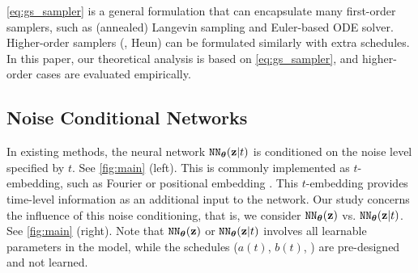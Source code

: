 \cref{eq:gs_sampler} is a general formulation that can encapsulate many first-order samplers, such as (annealed) Langevin sampling and Euler-based ODE solver. Higher-order samplers (\eg, Heun) can be formulated similarly with extra schedules. In this paper, our theoretical analysis is based on \cref{eq:gs_sampler}, and higher-order cases are evaluated empirically.

















\subsection{Noise Conditional Networks}\label{subsec:time_conditioning}

In existing methods, the neural network ${\texttt{NN}}_{{\bm{\theta}}}({\mathbf{z}}|t)$ is conditioned on the noise level specified by $t$. See \cref{fig:main} (left).
This is commonly implemented as $t$-embedding, such as Fourier \cite{tancik2020fourier} or positional embedding \cite{vaswani2017attention}. This $t$-embedding provides time-level information as an additional input to the network. Our study concerns the influence of this noise conditioning, that is, we consider ${\texttt{NN}}_{{\bm{\theta}}}({\mathbf{z}})$ vs. ${\texttt{NN}}_{{\bm{\theta}}}({\mathbf{z}} | t)$. See \cref{fig:main} (right). Note that ${\texttt{NN}}_{{\bm{\theta}}}({\mathbf{z}})$ or ${\texttt{NN}}_{{\bm{\theta}}}({\mathbf{z}} | t)$ involves all learnable parameters in the model, while the schedules ($a(t)$, $b(t)$, \etc) are pre-designed and not learned.

